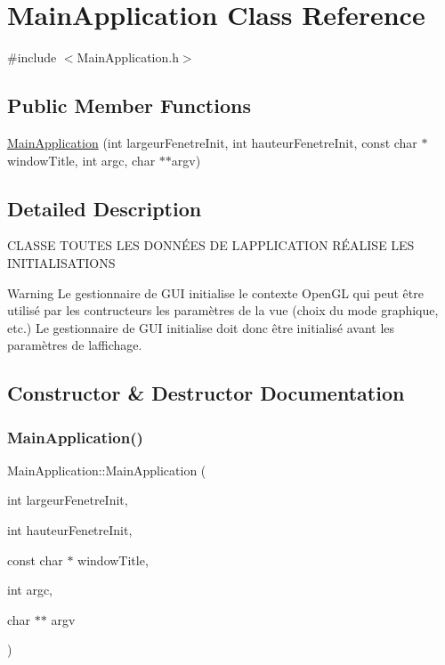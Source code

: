 \hypertarget{classMainApplication}{}\section{Main\+Application Class Reference}
\label{classMainApplication}


{\ttfamily \#include $<$Main\+Application.\+h$>$}

\subsection*{Public Member Functions}
\begin{DoxyCompactItemize}
\item 
\mbox{\hyperlink{classMainApplication_a2d07772831d02514d07888f9a3e66a6f}{Main\+Application}} (int largeur\+Fenetre\+Init, int hauteur\+Fenetre\+Init, const char $\ast$window\+Title, int argc, char $\ast$$\ast$argv)
\end{DoxyCompactItemize}


\subsection{Detailed Description}
C\+L\+A\+S\+SE T\+O\+U\+T\+ES L\+ES D\+O\+N\+NÉ\+ES DE L\textquotesingle{}A\+P\+P\+L\+I\+C\+A\+T\+I\+ON RÉ\+A\+L\+I\+SE L\+ES I\+N\+I\+T\+I\+A\+L\+I\+S\+A\+T\+I\+O\+NS \begin{DoxyWarning}{Warning}
Le gestionnaire de G\+UI initialise le contexte Open\+GL qui peut être utilisé par les contructeurs les paramètres de la vue (choix du mode graphique, etc.) Le gestionnaire de G\+UI initialise doit donc être initialisé avant les paramètres de l\textquotesingle{}affichage. 
\end{DoxyWarning}


\subsection{Constructor \& Destructor Documentation}
\mbox{\label{classMainApplication_a2d07772831d02514d07888f9a3e66a6f}} 
\subsubsection{\texorpdfstring{MainApplication()}{MainApplication()}}
{\footnotesize\ttfamily Main\+Application\+::\+Main\+Application (\begin{DoxyParamCaption}\item[{int}]{largeur\+Fenetre\+Init,  }\item[{int}]{hauteur\+Fenetre\+Init,  }\item[{const char $\ast$}]{window\+Title,  }\item[{int}]{argc,  }\item[{char $\ast$$\ast$}]{argv }\end{DoxyParamCaption})}



